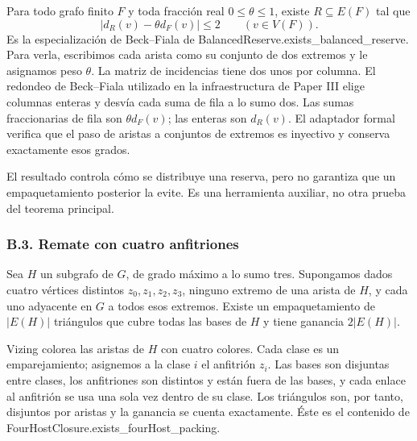 \documentclass[spanish,11pt,a4paper]{article}
\begin{document}
Para todo grafo finito \(F\) y toda fracción real \(0\le\theta\le1\), existe \(R\subseteq E(F)\) tal que \[
|d_R(v)-\theta d_F(v)|\le2\qquad(v\in V(F)).
\tag{B.4}
\] Es la especialización de Beck--Fiala de {\ttfamily\small BalancedRese\discretionary{\hbox{\ensuremath{\hookrightarrow}}}{}{}rve.\discretionary{\hbox{\ensuremath{\hookrightarrow}}}{}{}exists\_\discretionary{\hbox{\ensuremath{\hookrightarrow}}}{}{}balanced\_\discretionary{\hbox{\ensuremath{\hookrightarrow}}}{}{}reserve}. Para verla, escribimos cada arista como su conjunto de dos extremos y le asignamos peso \(\theta\). La matriz de incidencias tiene dos unos por columna. El redondeo de Beck--Fiala utilizado en la infraestructura de Paper III elige columnas enteras y desvía cada suma de fila a lo sumo dos. Las sumas fraccionarias de fila son \(\theta d_F(v)\); las enteras son \(d_R(v)\). El adaptador formal verifica que el paso de aristas a conjuntos de extremos es inyectivo y conserva exactamente esos grados.

El resultado controla cómo se distribuye una reserva, pero no garantiza que un empaquetamiento posterior la evite. Es una herramienta auxiliar, no otra prueba del teorema principal.

\subsubsection{B.3. Remate con cuatro anfitriones}\label{b.3.-remate-con-cuatro-anfitriones}

Sea \(H\) un subgrafo de \(G\), de grado máximo a lo sumo tres. Supongamos dados cuatro vértices distintos \(z_0,z_1,z_2,z_3\), ninguno extremo de una arista de \(H\), y cada uno adyacente en \(G\) a todos esos extremos. Existe un empaquetamiento de \(|E(H)|\) triángulos que cubre todas las bases de \(H\) y tiene ganancia \(2|E(H)|\).

Vizing colorea las aristas de \(H\) con cuatro colores. Cada clase es un emparejamiento; asignemos a la clase \(i\) el anfitrión \(z_i\). Las bases son disjuntas entre clases, los anfitriones son distintos y están fuera de las bases, y cada enlace al anfitrión se usa una sola vez dentro de su clase. Los triángulos son, por tanto, disjuntos por aristas y la ganancia se cuenta exactamente. Éste es el contenido de {\ttfamily\small FourHostClos\discretionary{\hbox{\ensuremath{\hookrightarrow}}}{}{}ure.\discretionary{\hbox{\ensuremath{\hookrightarrow}}}{}{}exists\_\discretionary{\hbox{\ensuremath{\hookrightarrow}}}{}{}fourHost\_\discretionary{\hbox{\ensuremath{\hookrightarrow}}}{}{}packing}.
\end{document}
